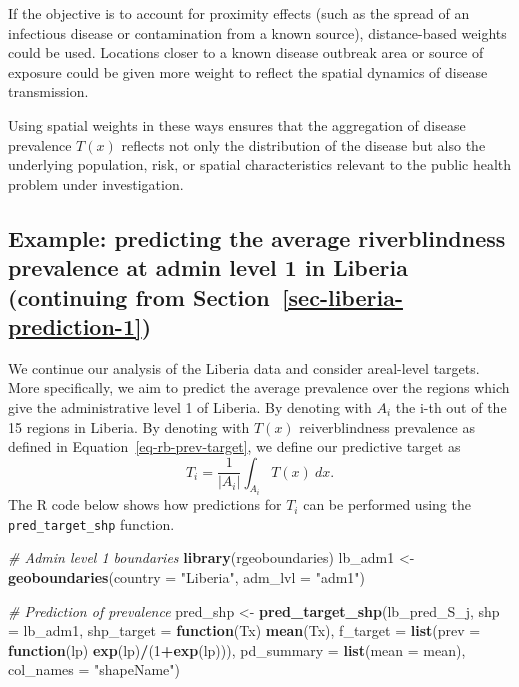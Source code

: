 \documentclass[
  letterpaper,
]{krantz}
\newenvironment{Shaded}{\begin{snugshade}}{\end{snugshade}}
\newcommand{\AttributeTok}[1]{\textcolor[rgb]{0.13,0.29,0.53}{#1}}
\newcommand{\CommentTok}[1]{\textcolor[rgb]{0.56,0.35,0.01}{\textit{#1}}}
\newcommand{\ControlFlowTok}[1]{\textcolor[rgb]{0.13,0.29,0.53}{\textbf{#1}}}
\newcommand{\DecValTok}[1]{\textcolor[rgb]{0.00,0.00,0.81}{#1}}
\newcommand{\FunctionTok}[1]{\textcolor[rgb]{0.13,0.29,0.53}{\textbf{#1}}}
\newcommand{\NormalTok}[1]{#1}
\newcommand{\OtherTok}[1]{\textcolor[rgb]{0.56,0.35,0.01}{#1}}
\newcommand{\SpecialCharTok}[1]{\textcolor[rgb]{0.81,0.36,0.00}{\textbf{#1}}}
\newcommand{\StringTok}[1]{\textcolor[rgb]{0.31,0.60,0.02}{#1}}
\begin{document}
If the objective is to account for proximity effects (such as the spread
of an infectious disease or contamination from a known source),
distance-based weights could be used. Locations closer to a known
disease outbreak area or source of exposure could be given more weight
to reflect the spatial dynamics of disease transmission.

Using spatial weights in these ways ensures that the aggregation of
disease prevalence \(T(x)\) reflects not only the distribution of the
disease but also the underlying population, risk, or spatial
characteristics relevant to the public health problem under
investigation.

\subsection{\texorpdfstring{Example: predicting the average
riverblindness prevalence at admin level 1 in Liberia (continuing from
Section~\ref{sec-liberia-prediction-1})}{Example: predicting the average riverblindness prevalence at admin level 1 in Liberia (continuing from Section~)}}\label{sec-liberia-prediction-2}

We continue our analysis of the Liberia data and consider areal-level
targets. More specifically, we aim to predict the average prevalence
over the regions which give the administrative level 1 of Liberia. By
denoting with \(A_i\) the i-th out of the 15 regions in Liberia. By
denoting with \(T(x)\) reiverblindness prevalence as defined in
Equation~\ref{eq-rb-prev-target}, we define our predictive target as \[
T_{i} = \frac{1}{|A_i|} \int_{A_i} T(x) \: dx.
\] The R code below shows how predictions for \(T_i\) can be performed
using the \texttt{pred\_target\_shp} function.

\begin{Shaded}
\begin{Highlighting}[]
\CommentTok{\# Admin level 1 boundaries}
\FunctionTok{library}\NormalTok{(rgeoboundaries)}
\NormalTok{lb\_adm1 }\OtherTok{\textless{}{-}} \FunctionTok{geoboundaries}\NormalTok{(}\AttributeTok{country =} \StringTok{"Liberia"}\NormalTok{, }\AttributeTok{adm\_lvl =} \StringTok{"adm1"}\NormalTok{)}

\CommentTok{\# Prediction of prevalence }
\NormalTok{pred\_shp }\OtherTok{\textless{}{-}} \FunctionTok{pred\_target\_shp}\NormalTok{(lb\_pred\_S\_j, }\AttributeTok{shp =}\NormalTok{ lb\_adm1,}
                            \AttributeTok{shp\_target =} \ControlFlowTok{function}\NormalTok{(Tx) }\FunctionTok{mean}\NormalTok{(Tx),}
                            \AttributeTok{f\_target =} \FunctionTok{list}\NormalTok{(}\AttributeTok{prev =} 
                                       \ControlFlowTok{function}\NormalTok{(lp) }\FunctionTok{exp}\NormalTok{(lp)}\SpecialCharTok{/}\NormalTok{(}\DecValTok{1}\SpecialCharTok{+}\FunctionTok{exp}\NormalTok{(lp))),}
                            \AttributeTok{pd\_summary =} \FunctionTok{list}\NormalTok{(}\AttributeTok{mean =}\NormalTok{ mean),}
                            \AttributeTok{col\_names =} \StringTok{"shapeName"}\NormalTok{)}
\end{Highlighting}
\end{Shaded}
\end{document}
